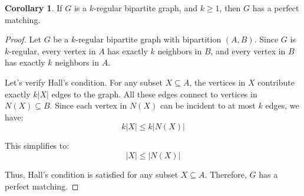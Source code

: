 \documentclass{article}
\theoremstyle{definition}
\newtheorem{corollary}{Corollary}
\begin{document}
\begin{corollary}
If $G$ is a $k$-regular bipartite graph, and $k \geq 1$, then $G$ has a perfect matching.
\end{corollary}

\begin{proof}
Let $G$ be a $k$-regular bipartite graph with bipartition $(A,B)$. Since $G$ is $k$-regular, every vertex in $A$ has exactly $k$ neighbors in $B$, and every vertex in $B$ has exactly $k$ neighbors in $A$. 

Let's verify Hall's condition. For any subset $X \subseteq A$, the vertices in $X$ contribute exactly $k|X|$ edges to the graph. All these edges connect to vertices in $N(X) \subseteq B$. Since each vertex in $N(X)$ can be incident to at most $k$ edges, we have:
\[k|X| \leq k|N(X)|\]

This simplifies to:
\[|X| \leq |N(X)|\]

Thus, Hall's condition is satisfied for any subset $X \subseteq A$. Therefore, $G$ has a perfect matching.
\end{proof}
\end{document}
